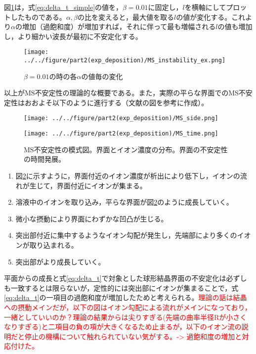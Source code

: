 \documentclass[autodetect-engine,dvi=dvipdfmx,a4paper,ja=standard,oneside,openany,11pt,draft]{bxjsbook}
\begin{document}
図\ref{fig:MS_instability_ex}は，式\ref{eq:delta_t_simple}の値を，$\beta=0.01$に固定し，$l$を横軸にしてプロットしたものである。$\alpha,\beta$の比を変えると，最大値を取る$l$の値が変化する。これより$\alpha$の増加（過飽和度）が増加すれば，それに伴って最も増幅される$l$の値も増加し，より細かい波長が最初に不安定化する。
\begin{figure}[htbp]
  \centering
  \texttt{[image: ../../figure/part2(exp\_deposition)/MS\_instability\_ex.png]}
  \caption{$\beta=0.01$の時の各$\alpha$の値毎の変化}
  \label{fig:MS_instability_ex}
\end{figure}

以上がMS不安定性の理論的な概要である。また，実際の平らな界面でのMS不安定性はおおよそ以下のように進行する（文献\cite{結晶成長}の図を参考に作成）。
\begin{figure}[htbp]
  \begin{minipage}
    {0.5\textwidth}
    \subcaption{}
    \centering
    \texttt{[image: ../../figure/part2(exp\_deposition)/MS\_side.png]}
    \label{fig:MS_side}
  \end{minipage}
  \begin{minipage}
    {0.5\textwidth}
    \subcaption{}
    \centering
    \texttt{[image: ../../figure/part2(exp\_deposition)/MS\_time.png]}
    \label{fig:MS_top}
  \end{minipage}
  \caption{MS不安定性の模式図。界面とイオン濃度の分布。界面の不安定性の時間発展。}
  \label{fig:MS}
\end{figure}
\begin{enumerate}
  \item 図\ref{fig:MS}に示すように，界面付近のイオン濃度が析出により低下し，イオンの流れが生じて，界面付近にイオンが集まる。
  \item 溶液中のイオンを取り込み，平らな界面が図\ref{fig:MS}のように成長していく。
  \item 微小な摂動により界面にわずかな凹凸が生じる。
  \item 突出部付近に集中するようなイオン勾配が発生し，先端部により多くのイオンが取り込まれる。
  \item 突出部がより成長していく。
\end{enumerate}
平面からの成長と式\eqref{eq:delta_t}で対象とした球形結晶界面の不安定化は必ずしも一致するとは限らないが，定性的には突出部にイオンが集まることで，式\eqref{eq:delta_t}の一項目の過飽和度が増加したためと考えられる。\textcolor{red}{理論の話は結晶への摂動メインだが，以下の図はイオン勾配による流れがメインになっており，一緒としていいのか？理論の結果からは尖りすぎる(先端の曲率半径Rが小さくなりすぎる)と二項目の負の項が大きくなるため止まるが，以下のイオン流の説明だと停止の機構について触れられていない気がする。-> 過飽和度の増加と対応付けた。}
\ifdraft{
  
  
}{}
\end{document}
